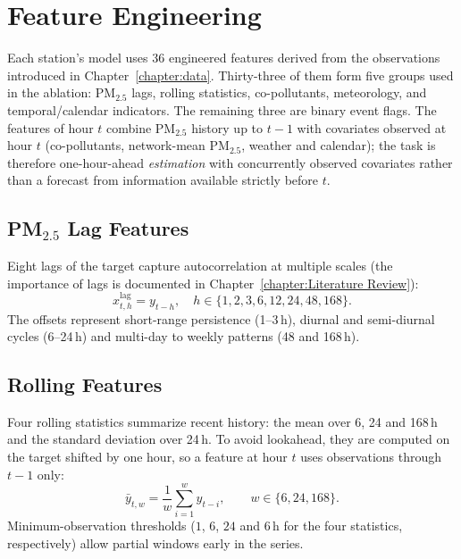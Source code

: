 \section{Feature Engineering}
\label{section:feature-engineering}
Each station's model uses 36 engineered features derived from the observations introduced in Chapter~\ref{chapter:data}. Thirty-three of them form five groups used in the ablation: PM$_{2.5}$ lags, rolling statistics, co-pollutants, meteorology, and temporal/calendar indicators. The remaining three are binary event flags. The features of hour $t$ combine PM$_{2.5}$ history up to $t-1$ with covariates observed at hour $t$ (co-pollutants, network-mean PM$_{2.5}$, weather and calendar); the task is therefore one-hour-ahead \emph{estimation} with concurrently observed covariates rather than a forecast from information available strictly before $t$.

\subsection{PM$_{2.5}$ Lag Features}
\label{subsection:lag-features}
Eight lags of the target capture autocorrelation at multiple scales (the importance of lags is documented in Chapter~\ref{chapter:Literature Review}):
\begin{equation}
    x^{\text{lag}}_{t,h} = y_{t-h}, \quad h \in \{1, 2, 3, 6, 12, 24, 48, 168\}.
\end{equation}
The offsets represent short-range persistence (1--3\,h), diurnal and semi-diurnal cycles (6--24\,h) and multi-day to weekly patterns (48 and 168\,h).

\subsection{Rolling Features}
\label{subsection:rolling-features}
Four rolling statistics summarize recent history: the mean over 6, 24 and 168\,h and the standard deviation over 24\,h. To avoid lookahead, they are computed on the target shifted by one hour, so a feature at hour $t$ uses observations through $t-1$ only:
\begin{equation}
    \bar{y}_{t,w} = \frac{1}{w} \sum_{i=1}^{w} y_{t-i}, \qquad w \in \{6, 24, 168\}.
\end{equation}
Minimum-observation thresholds ($1$, $6$, $24$ and $6$\,h for the four statistics, respectively) allow partial windows early in the series.

